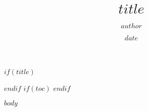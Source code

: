 \documentclass[11pt,numbers=noenddot,svgnames,dvipsnames]{$documentclass$}
\title{$title$}
\author{$author$}
\date{$date$}
\begin{document}
$if(title)$
\maketitle
$endif$
$if(toc)$
\tableofcontents
$endif$

$body$
\end{document}

